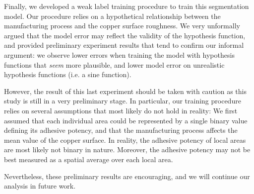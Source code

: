 \documentclass[10pt,twocolumn,letterpaper]{article}
\begin{document}
Finally, we developed a weak label training procedure to train this segmentation model.
Our procedure relies on a hypothetical relationship between the manufacturing process and the
copper surface roughness.
We very unformally argued that the model error may reflect the validity of the hypothesis function,
and provided preliminary experiment results that tend to confirm our informal argument:
we observe lower errors when training the model with hypothesis functions that \textit{seem} more plausible,
and lower model error on unrealistic hypothesis functions (i.e. a sine function).

However, the result of this last experiment should be taken with caution as this study is still in a very preliminary stage.
In particular, our training procedure relies on several assumptions that most likely do not hold in reality: 
We first assumed that each individual area could be represented by a single binary value defining its adhesive potency,
and that the manufacturing process affects the mean value of the copper surface.
In reality, the adhesive potency of local areas are most likely not binary in nature.
Moreover, the adhesive potency may not be best measured as a spatial average over each local area.

Nevertheless, these preliminary results are encouraging, and we will continue our analysis in future work.

{\small
	
	
}
\end{document}
